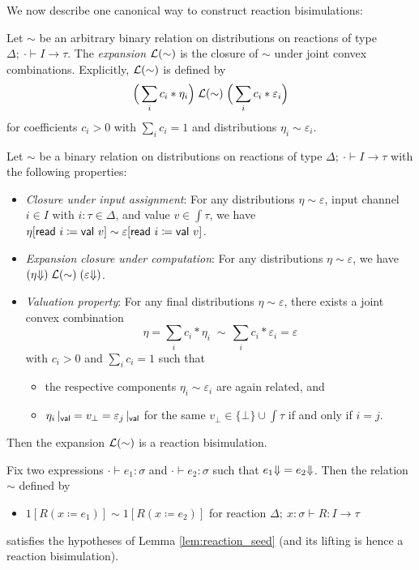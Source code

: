 \noindent We now describe one canonical way to construct reaction bisimulations:

\begin{definition}
Let $\sim$ be an arbitrary binary relation on distributions on reactions of type $\Delta; \ \cdot \vdash I \to \tau$. The \emph{expansion} $\mathcal{L}(\sim)$ is the closure of $\sim$ under joint convex combinations. Explicitly, $\mathcal{L}(\sim)$ is defined by
\[\Big(\sum_i c_i * \eta_i\Big) \; \mathcal{L}(\sim) \; \Big(\sum_i c_i * \varepsilon_i\Big)\]
for coefficients $c_i > 0$ with $\sum_i c_i = 1$ and distributions $\eta_i \sim \varepsilon_i$.
\end{definition}

\begin{lemma}\label{lem:reaction_seed}
Let $\sim$ be a binary relation on distributions on reactions of type $\Delta; \ \cdot \vdash I \to \tau$ with the following properties:
\begin{itemize}
\item \emph{Closure under input assignment}: For any distributions $\eta \sim \varepsilon$, input channel $i \in I$ with $i : \tau \in \Delta$, and value $v \in \int{\tau}$, we have $\eta[\mathsf{read} \ i \coloneqq \mathsf{val} \ v] \sim \varepsilon[\mathsf{read} \ i \coloneqq \mathsf{val} \ v]$.

\item \emph{Expansion closure under computation}: For any distributions $\eta \sim \varepsilon$, we have $({\eta \hspace{-2.5pt} \Downarrow}) \; \mathcal{L}(\sim) \; ({ \varepsilon \hspace{-2.5pt} \Downarrow})$.

\item \emph{Valuation property}: For any final distributions $\eta \sim \varepsilon$, there exists a joint convex combination \[\eta = \sum_i c_i * \eta_i \; \sim \, \sum_i c_i * \varepsilon_i = \varepsilon\]
with $c_i > 0$ and $\sum_i c_i = 1$ such that
\begin{itemize}
\item the respective components $\eta_i \sim \varepsilon_i$ are again related, and
\item $\eta_i \, |_{\mathsf{val}} = v_\bot = \varepsilon_j \, |_{\mathsf{val}}$ for the same $v_\bot \in \{\bot\} \cup \int{\tau}$ if and only if $i = j$.
\end{itemize}
\end{itemize}
Then the expansion $\mathcal{L}(\sim)$ is a reaction bisimulation.
\end{lemma}

\begin{example}
Fix two expressions $\cdot \vdash e_1 : \sigma$ and $\cdot \vdash e_2 : \sigma$ such that ${e_1 \hspace{-2.5pt} \Downarrow} = {e_2 \hspace{-2.5pt} \Downarrow}$. Then the relation $\sim$ defined by
\begin{itemize}
\item $1[R(x \coloneqq e_1)] \sim 1[R(x \coloneqq e_2)]$ for reaction $\Delta; \ x : \sigma \vdash R : I \to \tau$
\end{itemize}
satisfies the hypotheses of Lemma \ref{lem:reaction_seed} (and its lifting is hence a reaction bisimulation).
\end{example}

